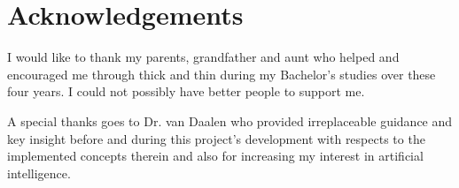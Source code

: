 
\chapter{Acknowledgements}

I would like to thank my parents, grandfather and aunt who helped and encouraged me through thick and thin during my Bachelor's studies over these four years. I could not possibly have better people to support me.

A special thanks goes to Dr. van Daalen who provided irreplaceable guidance and key insight before and during this project's development with respects to the implemented concepts therein and also for increasing my interest in artificial intelligence.